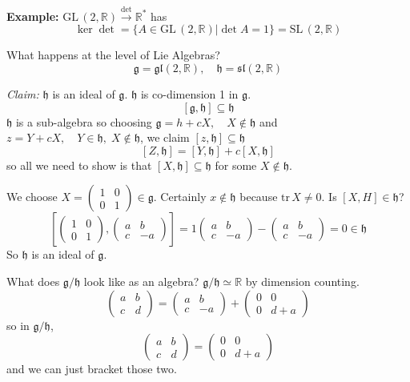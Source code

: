 \documentclass[12pt]{article}
\newcommand{\R}{\mathbb{R}}
\newcommand{\SL}{\text{SL}\,}
\newcommand{\GL}{\text{GL}\,}
\newcommand{\tr}{\text{tr}\,}
\newcommand{\g}{\mathfrak{g}}
\newcommand{\h}{\mathfrak{h}}
\begin{document}
    \textbf{Example:} $\GL(2, \R) \overset{\det}{\longrightarrow} \R^*$ has 
    \[\ker \det = \{A \in \GL(2, \R) \big\vert \det A = 1\} = \SL(2, \R)\]

    What happens at the level of Lie Algebras? 
    \[\g = \mathfrak{gl}(2, \R), \quad \h = \mathfrak{sl}(2, \R)\] 

    \emph{Claim:} $\h$ is an ideal of $\g$. $\h$ is co-dimension 1 in $\g$. 
    \[[\g, \h] \subseteq \h\]
    $\h$ is a sub-algebra so choosing $\g = h + cX, \quad X \notin \h$ and $z = Y + cX, \quad Y \in \h, \; X \notin \h$, we claim $[z, \h] \subseteq \h$
    \[[Z, \h] = [Y, \h] + c[X, \h]\]
    so all we need to show is that $[X, \h] \subseteq \h$ for some $X \notin \h$. 
    
    We choose $X = \begin{pmatrix}
        1 & 0\\
        0 & 1
    \end{pmatrix} \in \g$. Certainly $x \notin \h$ because $\tr X \neq 0$. Is $[X, H] \in \h$? 
    \[\left[\begin{pmatrix}
        1 & 0\\ 
        0 & 1
    \end{pmatrix}, \begin{pmatrix}
        a & b\\ 
        c & -a
    \end{pmatrix}\right] = 1 \begin{pmatrix}
        a & b\\ 
        c & -a
    \end{pmatrix} -  \begin{pmatrix}
        a & b\\ 
        c & -a
    \end{pmatrix} = 0 \in \h\] 
    So $\h$ is an ideal of $\g$. 

    What does $\g/\h$ look like as an algebra? $\g/\h \simeq \R$ by dimension counting. 
    \[\begin{pmatrix}
        a & b\\ 
        c & d
    \end{pmatrix} = \begin{pmatrix}
        a & b\\ 
        c & -a
    \end{pmatrix} + \begin{pmatrix}
        0 & 0\\ 
        0 & d + a
    \end{pmatrix}\]
    so in $\g/\h$, 
    \[\begin{pmatrix}
        a & b\\ 
        c & d
    \end{pmatrix} = \begin{pmatrix}
        0 & 0\\ 
        0 & d + a
    \end{pmatrix}\]
    and we can just bracket those two. 
\end{document}
